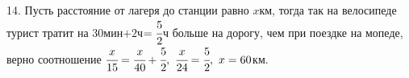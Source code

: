 14. Пусть расстояние от лагеря до станции равно $x$км, тогда так на велосипеде турист тратит на 30мин$+2$ч$=\cfrac{5}{2}$ч больше на дорогу, чем при поездке на мопеде, верно соотношение $\cfrac{x}{15}=\cfrac{x}{40}+\cfrac{5}{2},\ \cfrac{x}{24}=\cfrac{5}{2},\ x=60$км.\\
